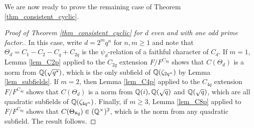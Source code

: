 We are now ready to prove the remaining case of Theorem \ref{thm_consistent_cyclic}.

\begin{proof}[Proof of Theorem \ref{thm_consistent_cyclic} for $d$ even and with one odd prime factor.]
    In this case, write $d=2^mq^n$ for $n,m\geq 1$ and note that $\Theta_{d}=C_1-C_2-C_q+C_{2q}$ is the $\psi_d$-relation of a faithful character of $C_d$. If $m=1$, Lemma \ref{lem_C2p} applied to the $C_{2q}$ extension $F/F^{C_{2q}}$ shows that $C(\Theta_d)$ is a norm from $\mathbb{Q}(\sqrt{q^*})$, which is the only subfield of $\mathbb{Q}(\zeta_{2q^n})$ by Lemma \ref{lem_subfields}. If $m=2$, then Lemma \ref{lem_C4p} applied to the $C_{4q}$ extension $F/F^{C_{4q}}$ shows that $C(\Theta_{d})$ is a norm from $\mathbb{Q}(i),\mathbb{Q}(\sqrt{q})$ and $\mathbb{Q}(\sqrt{q})$, which are all quadratic subfields of $\mathbb{Q}(\zeta_{4q^n})$. Finally, if $m\geq3$, Lemma \ref{lem_C8p} applied to $F/F^{C_{8q}}$ shows that $C(\Theta_{8q})\in(\mathbb{Q}^{\times})^2$, which is the norm from any quadratic subfield. The result follows.
    
\end{proof}

